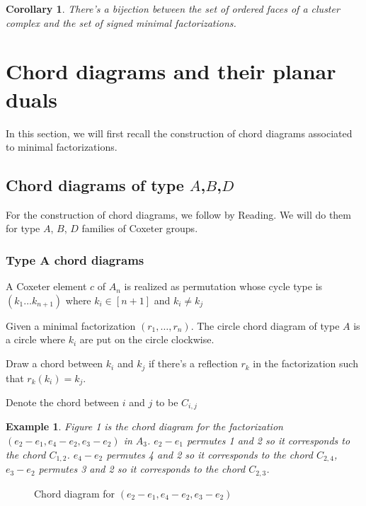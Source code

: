 \documentclass[11pt]{amsart}
\newtheorem{cor}[thm]{Corollary}%
\newtheorem{exa}[thm]{Example}%
\begin{document}
\begin{cor}
    There's a bijection between the set of ordered faces of a cluster complex and the set of signed minimal factorizations.
\end{cor}

\section{Chord diagrams and their planar duals}

In this section, we will first recall the construction of chord diagrams associated to minimal factorizations.

\subsection{Chord diagrams of type $A$,$B$,$D$}
For the construction of chord diagrams, we follow \cite{reading2007clusters} by Reading. We will do them for type $A$, $B$, $D$ families of Coxeter groups.

\subsubsection{Type A chord diagrams} 

A Coxeter element $c$ of $A_n$ is realized as permutation whose cycle type is $(k_1 \dots k_{n+1})$ where $k_i \in [n+1]$ and $k_i \neq k_j$ 

Given a minimal factorization $(r_1,\dots,r_n)$. The circle chord diagram of type $A$ is a circle where $k_i$ are put on the circle clockwise. 

Draw a chord between $k_i$ and $k_j$ if there's a reflection $r_k$ in the factorization such that $r_k(k_i)=k_j$.

Denote the chord between $i$ and $j$ to be $C_{i,j}$

\begin{exa}
    Figure 1 is the chord diagram for the factorization $(e_2-e_1,e_4-e_2,e_3-e_2)$ in $A_3$. $e_2-e_1$ permutes 1 and 2 so it corresponds to the chord $C_{1,2}$. $e_4-e_2$ permutes 4 and 2 so it corresponds to the chord $C_{2,4}$, $e_3-e_2$ permutes 3 and 2 so it corresponds to the chord $C_{2,3}$.
\end{exa}

\begin{figure}
    \centering
    \caption{Chord diagram for $(e_2-e_1,e_4-e_2,e_3-e_2)$}
\end{figure}
\end{document}
